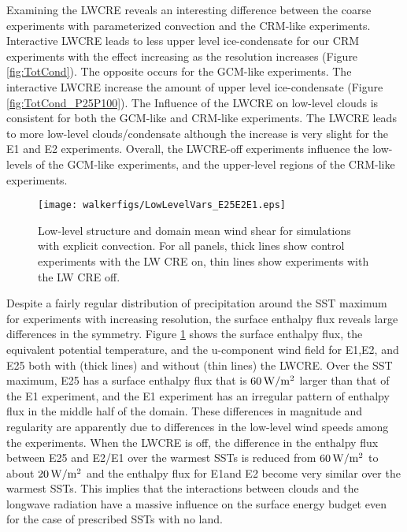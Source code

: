 \documentclass[draft]{agujournal2019}
\begin{document}
Examining the LWCRE reveals an interesting difference between the coarse experiments with parameterized convection
and the CRM-like experiments.  Interactive LWCRE leads to less upper level ice-condensate for our CRM experiments
with the effect increasing as the resolution increases (Figure \ref{fig:TotCond}).  The opposite occurs for the 
GCM-like experiments.  The interactive LWCRE increase the amount of upper level ice-condensate 
(Figure \ref{fig:TotCond_P25P100}).    The Influence of the LWCRE on low-level clouds is consistent for both the 
GCM-like and CRM-like experiments.  The LWCRE leads to more low-level clouds/condensate although the 
increase is very slight for the E1 and E2 experiments.  Overall, the LWCRE-off experiments influence the low-levels 
of the GCM-like experiments, and the upper-level regions of the CRM-like experiments.     


\begin{figure}
  \centering
    \texttt{[image: walkerfigs/LowLevelVars\_E25E2E1.eps]}
    \caption{Low-level structure and domain mean wind shear for simulations with explicit convection.  
    For all panels, thick lines show control experiments with the LW CRE on, thin lines show experiments
    with the LW CRE off.}
    \label{fig:enthalpy}
\end{figure}

Despite a fairly regular distribution of precipitation around the SST maximum for experiments with increasing resolution, the 
surface enthalpy flux reveals large differences in the symmetry.   Figure \ref{fig:enthalpy} shows the surface enthalpy flux, 
the equivalent potential temperature, and the u-component wind field for E1,E2, and E25 both with (thick lines) and 
without (thin lines) the LWCRE.  Over the SST maximum, E25 has a surface enthalpy flux that is $60 \, \rm{W/m^2}$ 
larger than that of the E1 experiment, and the E1 experiment has an irregular pattern of enthalpy flux in the middle
half of the domain.  These differences in magnitude and regularity are apparently due to differences in the low-level 
wind speeds among the experiments.  When the LWCRE is off, the difference in the enthalpy flux between E25 and E2/E1 
over the warmest SSTs is reduced from $60 \, \rm{W/m^2}$ to about $20 \, \rm{W/m^2}$ and the enthalpy
flux for E1and E2 become very similar over the warmest SSTs.  This implies that the interactions between clouds
and the longwave radiation have a massive influence on the surface energy budget even for the case of prescribed
SSTs with no land.     
\end{document}
